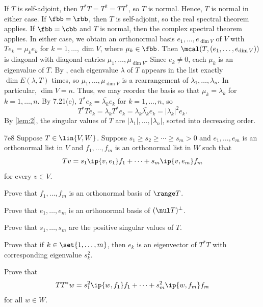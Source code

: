\begin{sol}
    If $T$ is self-adjoint, then $T^\ast T = T^2 = TT^\ast$, so $T$ is normal.
    Hence, $T$ is normal in either case.
    If $\fbb = \rbb$, then $T$ is self-adjoint, so the real spectral theorem applies.
    If $\fbb = \cbb$ and $T$ is normal, then the complex spectral theorem applies.
    In either case, we obtain an orthonormal basis $e_1, \ldots, e_{\dim V}$ of $V$ with $T e_k = \mu_k e_k$ for $k = 1, \ldots, \dim V$, where $\mu_k \in \fbb$.
    Then $\mcal(T, (e_1, \ldots, e_{\dim V}))$ is diagonal with diagonal entries $\mu_1, \ldots, \mu_{\dim V}$.
    Since $e_k \neq 0$, each $\mu_k$ is an eigenvalue of $T$.
    By , each eigenvalue $\lambda$ of $T$ appears in the list exactly $\dim E(\lambda, T)$ times, so $\mu_1, \ldots, \mu_{\dim V}$ is a rearrangement of $\lambda_1, \ldots, \lambda_n$.
    In particular, $\dim V = n$.
    Thus, we may reorder the basis so that $\mu_k = \lambda_k$ for $k = 1, \ldots, n$.
    By 7.21(e), $T^\ast e_k = \bar{\lambda_k} e_k$ for $k = 1, \ldots, n$, so
    \[
        T^\ast T e_k = \lambda_k T^\ast e_k = \lambda_k \bar{\lambda_k} e_k = |\lambda_k|^2 e_k.
    \]
    By \autoref{lem:2}, the singular values of $T$ are $|\lambda_1|, \ldots, |\lambda_n|$, sorted into decreasing order.
\end{sol}

\begin{exercise}{7e8}
    Suppose $T \in \lin{V, W}$.
    Suppose $s_1 \geq s_2 \geq \cdots \geq s_m > 0$ and $e_1, \ldots, e_m$ is an orthonormal list in $V$ and $f_1, \ldots, f_m$ is an orthonormal list in $W$ such that
    \[
        Tv = s_1 \ip{v, e_1} f_1 + \cdots + s_m \ip{v, e_m} f_m
    \]
    for every $v \in V$.
    \begin{subexercises}
        \item Prove that $f_1, \ldots, f_m$ is an orthonormal basis of $\range T$.
        \item Prove that $e_1, \ldots, e_m$ is an orthonormal basis of $(\nul T)^\perp$.
        \item Prove that $s_1, \ldots, s_m$ are the positive singular values of $T$.
        \item Prove that if $k \in \set{1, \ldots, m}$, then $e_k$ is an eigenvector of $T^\ast T$ with corresponding eigenvalue $s_k^2$.
        \item Prove that
        \[
            TT^\ast w = s_1^2 \ip{w, f_1} f_1 + \cdots + s_m^2 \ip{w, f_m} f_m
        \]
        for all $w \in W$.
    \end{subexercises}
\end{exercise}


